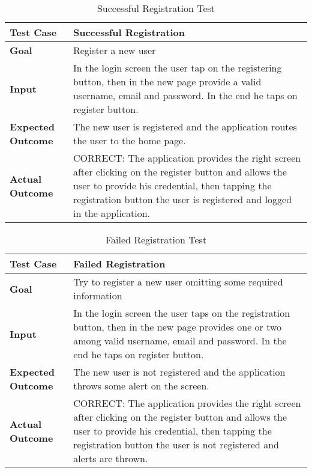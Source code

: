 \begin{table}[H]
	\centering
	\begin{tabular}{|l|l|}
	\hline
	\textbf{Test Case}& Successful Registration\\
	\hline
	\textbf{Goal}& Register a new user\\
	\hline
	\textbf{Input}& 
	\begin{minipage}{.7\linewidth}
	In the login screen the user tap on the registering button, then in the new page provide a valid username, email and password. In the end he taps on register button.
	\end{minipage}\\
	\hline
	\textbf{Expected Outcome}& 
	\begin{minipage}{.7\linewidth}
	The new user is registered and the application routes the user to the home page.
	\end{minipage}\\
	\hline
	\textbf{Actual Outcome}& 
	\begin{minipage}{.7\linewidth}
	CORRECT: The application provides the right screen after clicking on the register button and allows the user to provide his credential, then tapping the registration button the user is registered and logged in the application.
	\end{minipage}\\
	\hline	
	\end{tabular}
	\caption{Successful Registration Test}
\end{table}

\begin{table}[H]
	\centering
	\begin{tabular}{|l|l|}
	\hline
	\textbf{Test Case}& Failed Registration\\
	\hline
	\textbf{Goal}& Try to register a new user omitting some required information\\
	\hline
	\textbf{Input}& 
	\begin{minipage}{.7\linewidth}
	In the login screen the user taps on the registration button, then in the new page provides one or two among valid username, email and password. In the end he taps on register button.
	\end{minipage}\\
	\hline
	\textbf{Expected Outcome}&
	\begin{minipage}{.7\linewidth}
	The new user is not registered and the application throws some alert on the screen.
	\end{minipage}\\
	\hline
	\textbf{Actual Outcome}& 
	\begin{minipage}{.7\linewidth}
	CORRECT: The application provides the right screen after clicking on the register button and allows the user to provide his credential, then tapping the registration button the user is not registered and alerts are thrown.
	\end{minipage}\\
	\hline	
	\end{tabular}
	\caption{Failed Registration Test}
\end{table}

